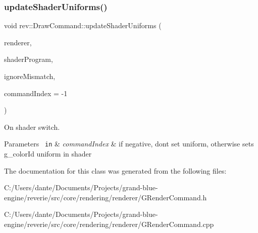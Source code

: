\subsubsection{\texorpdfstring{updateShaderUniforms()}{updateShaderUniforms()}}
{\footnotesize\ttfamily void rev\+::\+Draw\+Command\+::update\+Shader\+Uniforms (\begin{DoxyParamCaption}\item[{\mbox{\hyperlink{classrev_1_1_main_renderer}{Main\+Renderer}} \&}]{renderer,  }\item[{\mbox{\hyperlink{classrev_1_1_shader_program}{Shader\+Program}} \&}]{shader\+Program,  }\item[{bool}]{ignore\+Mismatch,  }\item[{int}]{command\+Index = {\ttfamily -\/1} }\end{DoxyParamCaption})\hspace{0.3cm}{\ttfamily [protected]}}



On shader switch. 


\begin{DoxyParams}[1]{Parameters}
\mbox{\texttt{ in}}  & {\em command\+Index} & if negative, don\textquotesingle{}t set uniform, otherwise sets g\+\_\+color\+Id uniform in shader \\
\hline
\end{DoxyParams}


The documentation for this class was generated from the following files\+:\begin{DoxyCompactItemize}
\item 
C\+:/\+Users/dante/\+Documents/\+Projects/grand-\/blue-\/engine/reverie/src/core/rendering/renderer/G\+Render\+Command.\+h\item 
C\+:/\+Users/dante/\+Documents/\+Projects/grand-\/blue-\/engine/reverie/src/core/rendering/renderer/G\+Render\+Command.\+cpp\end{DoxyCompactItemize}
